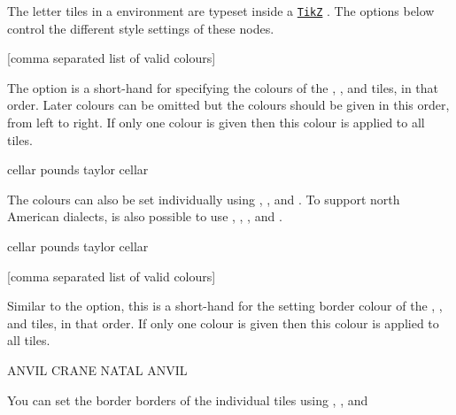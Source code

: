 \documentclass[svgnames]{report}
\newcommand\ctan[1]{\href{https://www.ctan.org/pkg/#1}{\texttt{#1}}}
\begin{document}
  The letter tiles in a  environment are typeset inside
  a \ctan{TikZ} \keyword{\node}. The options below control the different
  style settings of these nodes.

  [comma separated list of valid colours]

  The  option is a short-hand for specifying the colours
  of the , ,  and
   tiles, in that order. Later colours can be omitted but
  the colours should be given in this order, from left to right.
  If only one colour is given then this colour is applied to all tiles.

  \begin{example}
  \begin{wordle}[colours={LightGray,Orange,Teal}]{cellar}
    pounds
    taylor
    cellar
  \end{wordle}
  \end{example}

  The colours can also be set individually using ,
  ,  and .  To support north American dialects, is also possible to use
  , , ,
   and .

  \begin{example}
  \begin{wordle}[absent colour=DarkGray,present color=Salmon,
                 correct color=SeaGreen]{cellar}
    pounds
    taylor
    cellar
  \end{wordle}
  \end{example}

  [comma separated list of valid colours]

  Similar to the  option, this is a short-hand for the
  setting border colour of the , ,
   and  tiles, in that order.
  If only one colour is given then this colour is applied to all tiles.

  \begin{example}
  \begin{wordle}[borders={red, orange,blue}]{ANVIL}
    CRANE
    NATAL
    ANVIL
  \end{wordle}
  \end{example}

  You can set the border borders of the individual tiles using
  , ,  and 
\end{document}
